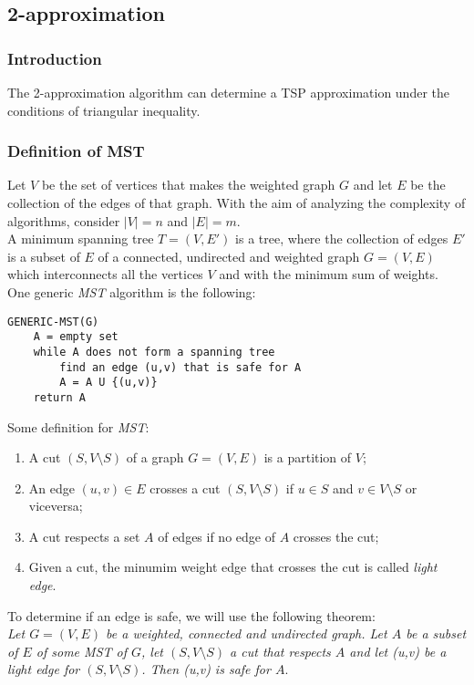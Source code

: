 \subsection{2-approximation}

\subsubsection{Introduction}
The 2-approximation algorithm can determine a TSP approximation under the conditions of triangular inequality.

\subsubsection{Definition of MST}
Let $V$ be the set of vertices that makes the weighted graph $G$ and let $E$ be the collection of the edges of that graph. With the aim of analyzing the complexity of algorithms, consider $|V| = n$ and $|E| = m$. \\
A minimum spanning tree $T = (V,E')$ is a tree, where the collection of edges $E'$ is a subset of $E$ of a connected, undirected and weighted graph $G = (V,E)$ which interconnects all the vertices $V$ and with the minimum sum of weights. \\

\noindent
One generic \textit{MST} algorithm is the following: 
\begin{verbatim}
GENERIC-MST(G)
    A = empty set
    while A does not form a spanning tree
        find an edge (u,v) that is safe for A
        A = A U {(u,v)}
    return A
\end{verbatim}
\noindent
Some definition for \textit{MST}:
\begin{enumerate}
    \item A cut $(S, V \setminus S)$ of a graph $G = (V, E)$ is a partition of $V$;
    \item An edge $(u,v) \in E$ crosses a cut $(S, V \setminus S)$ if $u\in S$ and $v \in V \setminus S$ or viceversa;
    \item A cut respects a set $A$ of edges if no edge of $A$ crosses the cut;
    \item Given a cut, the minumim weight edge that crosses the cut is called \textit{light edge}.
\end{enumerate}
\noindent
To determine if an edge is safe, we will use the following theorem: \\

\noindent
\textit{Let $G = (V,E)$ be a weighted, connected and undirected graph. Let $A$ be a subset of $E$ of some \textit{MST} of $G$, let $(S, V \setminus S)$ a cut that respects $A$ and let (u,v) be a light edge for $(S, V \setminus S)$. Then (u,v) is safe for $A$}.

